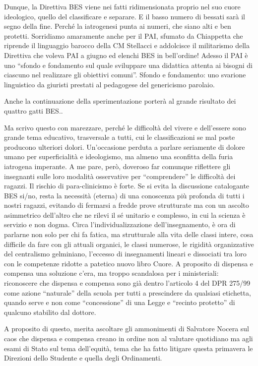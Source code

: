 Dunque, la Direttiva BES viene nei fatti ridimensionata proprio nel suo cuore ideologico, quello del  classificare e separare. E il basso numero di bessati sarà il segno della fine. Perché la iatrogenesi punta ai numeri, che siano alti e ben protetti.  
Sorridiamo amaramente anche per il PAI, sfumato da Chiappetta  che riprende il linguaggio barocco della CM Stellacci  e addolcisce il militarismo della Direttiva che voleva PAI a giugno ed elenchi BES in bell'ordine! Adesso il  PAI è uno   “sfondo e fondamento sul quale sviluppare una didattica attenta ai bisogni di ciascuno nel realizzare gli obiettivi comuni”. Sfondo e fondamento: uno svarione linguistico da giuristi prestati al pedagogese del genericismo parolaio.

Anche la continuazione della sperimentazione porterà al grande risultato dei quattro gatti BES..

Ma scrivo questo con marezzare, perché le difficoltà del vivere e dell'essere sono grande tema educativo, trasversale a tutti, cui le classificazioni se mal poste producono ulteriori dolori. Un'occasione perduta a parlare seriamente di dolore umano per superficialità e ideologismo, ma almeno una sconfitta della furia iatrogena imperante.
A me pare, però, doveroso far comunque riflettere gli insegnanti sulle loro modalità osservative per “comprendere” le difficoltà dei ragazzi. Il rischio di para-clinicismo è forte.  Se si evita la discussione catalogante BES si/no, resta la necessità (eterna) di una conoscenza più profonda di tutti i nostri ragazzi, evitando di fermarsi a fredde prove  strutturate ma con un ascolto asimmetrico dell'altro che ne rilevi il sé unitario e complesso, in cui la scienza è servizio e non dogma.  Circa l'individualizzazione dell'insegnamento, è ora di parlarne non solo per chi fa fatica,  ma strutturale alla vita delle classi intere, cosa  difficile da fare con gli attuali organici, le classi numerose, le rigidità organizzative del centralismo gelminiano, l'eccesso di insegnamenti lineari e dissociati tra loro con le competenze ridotte a patetico nuovo libro Cuore.
A proposito di dispensa e compensa una soluzione c'era, ma troppo scandalosa per i ministeriali: riconoscere che dispensa e compensa sono già dentro l'articolo 4 del DPR 275/99 come azione “naturale” della scuola per tutti a prescindere da qualsiasi etichetta, quando serve e non come “concessione” di una Legge e “recinto protetto” di qualcuno stabilito dal dottore.

A proposito di questo, merita ascoltare gli ammonimenti di Salvatore Nocera sul caos che dispensa e compensa creano in ordine non al valutare quotidiano ma agli esami di Stato sul tema dell'equità, tema che ha fatto litigare questa primavera le Direzioni dello Studente e quella degli Ordinamenti.
